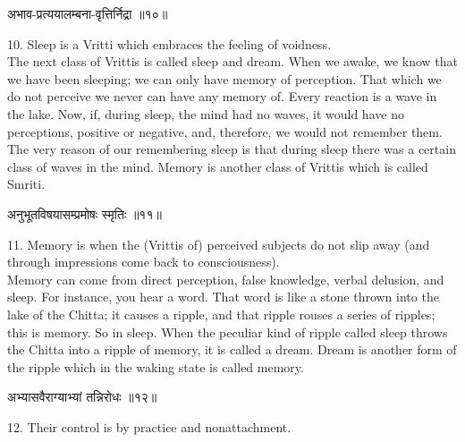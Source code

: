 \begin{center}
\begin{sanskrit}
अभाव-प्रत्ययालम्बना-वृत्तिर्निद्रा ॥१०॥
\end{sanskrit}
\end{center}
10. Sleep is a Vritti which embraces the feeling of voidness. \\

The next class of Vrittis is called sleep and dream. When we
awake, we know that we have been sleeping; we can only have memory of
perception. That which we do not perceive we never can have any memory
of. Every reaction is a wave in
the lake. Now, if, during sleep, the mind had no waves, it would have
no perceptions, positive or negative, and, therefore, we would not
remember them. The very reason of our remembering sleep is that during
sleep there was a certain class of waves in the mind. Memory is another
class of Vrittis which is called Smriti. \\

\begin{center}
\begin{sanskrit}
अनुभूतविषयासम्प्रमोषः स्मृतिः ॥११॥
\end{sanskrit}
\end{center}
11. Memory is when the (Vrittis of) perceived subjects do not
slip away (and through impressions come back to consciousness). \\

Memory can come from direct perception, false knowledge,
verbal delusion, and sleep. For instance, you hear a word. That word is
like a stone thrown into the lake of the Chitta; it causes a ripple,
and that ripple rouses a series of ripples; this is memory. So in
sleep. When the peculiar kind of ripple called sleep throws the Chitta
into a ripple of memory, it is called a dream. Dream is another form of
the ripple which in the waking state is called memory.\\

\begin{center}
\begin{sanskrit}
अभ्यासवैराग्याभ्यां तन्निरोधः ॥१२॥
\end{sanskrit}
\end{center}
12. Their control is by practice and nonattachment. \\

